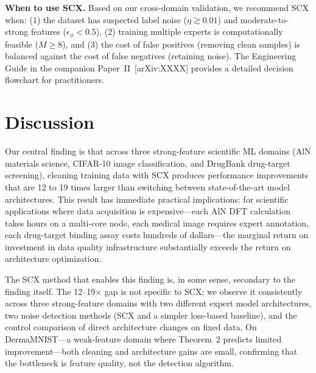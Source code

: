 \documentclass[12pt,a4paper]{article}
\begin{document}
\textbf{When to use SCX.} Based on our cross-domain validation, we recommend SCX when: (1) the dataset has suspected label noise ($\eta \gtrsim 0.01$) and moderate-to-strong features ($\epsilon_\phi < 0.5$), (2) training multiple experts is computationally feasible ($M \geq 8$), and (3) the cost of false positives (removing clean samples) is balanced against the cost of false negatives (retaining noise). The Engineering Guide in the companion Paper~II~[arXiv:XXXX] provides a detailed decision flowchart for practitioners.

\section{Discussion}

Our central finding is that across three strong-feature scientific ML domains (AlN materials science, CIFAR-10 image classification, and DrugBank drug-target screening), cleaning training data with SCX produces performance improvements that are 12 to 19 times larger than switching between state-of-the-art model architectures. This result has immediate practical implications: for scientific applications where data acquisition is expensive---each AlN DFT calculation takes hours on a multi-core node, each medical image requires expert annotation, each drug-target binding assay costs hundreds of dollars---the marginal return on investment in data quality infrastructure substantially exceeds the return on architecture optimization.

The SCX method that enables this finding is, in some sense, secondary to the finding itself. The 12--19$\times$ gap is not specific to SCX; we observe it consistently across three strong-feature domains with two different expert model architectures, two noise detection methods (SCX and a simpler loss-based baseline), and the control comparison of direct architecture changes on fixed data. On DermaMNIST---a weak-feature domain where Theorem~2 predicts limited improvement---both cleaning and architecture gains are small, confirming that the bottleneck is feature quality, not the detection algorithm.
\end{document}
